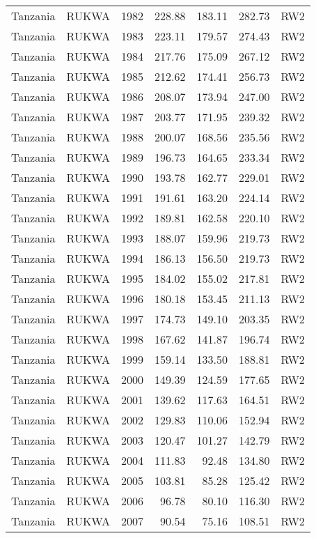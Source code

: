 \begin{longtable}{lllrrrl}
  Tanzania & RUKWA & 1982 & 228.88 & 183.11 & 282.73 & RW2 \\ 
  Tanzania & RUKWA & 1983 & 223.11 & 179.57 & 274.43 & RW2 \\ 
  Tanzania & RUKWA & 1984 & 217.76 & 175.09 & 267.12 & RW2 \\ 
  Tanzania & RUKWA & 1985 & 212.62 & 174.41 & 256.73 & RW2 \\ 
  Tanzania & RUKWA & 1986 & 208.07 & 173.94 & 247.00 & RW2 \\ 
  Tanzania & RUKWA & 1987 & 203.77 & 171.95 & 239.32 & RW2 \\ 
  Tanzania & RUKWA & 1988 & 200.07 & 168.56 & 235.56 & RW2 \\ 
  Tanzania & RUKWA & 1989 & 196.73 & 164.65 & 233.34 & RW2 \\ 
  Tanzania & RUKWA & 1990 & 193.78 & 162.77 & 229.01 & RW2 \\ 
  Tanzania & RUKWA & 1991 & 191.61 & 163.20 & 224.14 & RW2 \\ 
  Tanzania & RUKWA & 1992 & 189.81 & 162.58 & 220.10 & RW2 \\ 
  Tanzania & RUKWA & 1993 & 188.07 & 159.96 & 219.73 & RW2 \\ 
  Tanzania & RUKWA & 1994 & 186.13 & 156.50 & 219.73 & RW2 \\ 
  Tanzania & RUKWA & 1995 & 184.02 & 155.02 & 217.81 & RW2 \\ 
  Tanzania & RUKWA & 1996 & 180.18 & 153.45 & 211.13 & RW2 \\ 
  Tanzania & RUKWA & 1997 & 174.73 & 149.10 & 203.35 & RW2 \\ 
  Tanzania & RUKWA & 1998 & 167.62 & 141.87 & 196.74 & RW2 \\ 
  Tanzania & RUKWA & 1999 & 159.14 & 133.50 & 188.81 & RW2 \\ 
  Tanzania & RUKWA & 2000 & 149.39 & 124.59 & 177.65 & RW2 \\ 
  Tanzania & RUKWA & 2001 & 139.62 & 117.63 & 164.51 & RW2 \\ 
  Tanzania & RUKWA & 2002 & 129.83 & 110.06 & 152.94 & RW2 \\ 
  Tanzania & RUKWA & 2003 & 120.47 & 101.27 & 142.79 & RW2 \\ 
  Tanzania & RUKWA & 2004 & 111.83 & 92.48 & 134.80 & RW2 \\ 
  Tanzania & RUKWA & 2005 & 103.81 & 85.28 & 125.42 & RW2 \\ 
  Tanzania & RUKWA & 2006 & 96.78 & 80.10 & 116.30 & RW2 \\ 
  Tanzania & RUKWA & 2007 & 90.54 & 75.16 & 108.51 & RW2 \\ 

\end{longtable}
